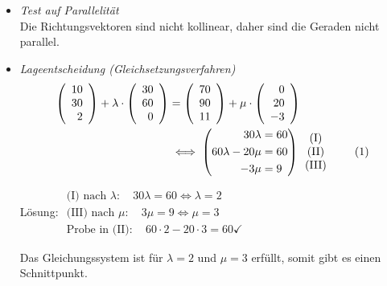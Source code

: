 \documentclass{ajc}
\numberwithin{equation}{subsection}
\newcommand\numberthis{\addtocounter{equation}{1}\tag{\theequation}}
\begin{document}
	\begin{itemize}
		\item \textit{Test auf Parallelität} \\ 
		Die Richtungsvektoren sind nicht kollinear, daher sind die Geraden nicht parallel.
		
		\item \textit{Lageentscheidung (Gleichsetzungsverfahren)} \\
		\begin{alignat*}{2}
			\left(\begin{array}{r} 10 \\ 30 \\ 2\end{array}\right) + \lambda \cdot \left(\begin{array}{r} 30 \\ 60 \\ 0\end{array}\right) &= \left(\begin{array}{r} 70 \\ 90 \\ 11\end{array}\right) + \mu \cdot \left(\begin{array}{r} 0 \\ 20 \\ -3\end{array}\right) \\
			&\iff \left(\begin{aligned} 30 \lambda &= 60 \\ 60 \lambda - 20 \mu &= 60 \\ -3 \mu &= 9 \end{aligned}\right) \begin{array}{c} \text{(I)} \\ \text{(II)} \\ \text{(III)}\end{array} \numberthis
		\end{alignat*}
		
		Lösung: $\begin{array}{l}
			\text{(I) nach } \lambda: \quad 30 \lambda = 60 \Leftrightarrow \lambda = 2 \\ \text{(III) nach } \mu: \quad 3\mu = 9 \Leftrightarrow \mu = 3 \\ \text{Probe in  (II)}: \quad 60\cdot2 -20\cdot3 = 60 \checkmark \end{array}$
		
		Das Gleichungssystem ist für $\lambda = 2$ und $\mu = 3$ erfüllt, somit gibt es einen Schnittpunkt.
		

\end{itemize}
\end{document}
